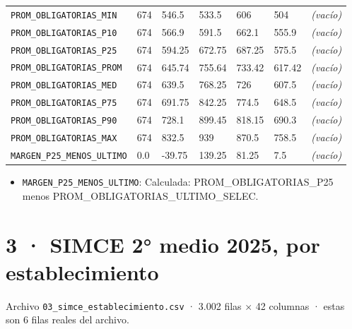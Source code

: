 \documentclass[10pt]{article}
\begin{document}
\begin{xltabular}{\linewidth}{@{}p{4.3cm} Y Y Y Y Y Y @{}}
\texttt{PROM\_\allowbreak{}OBLIGATORIAS\_\allowbreak{}MIN} & 674 & 546.5 & 533.5 & 606 & 504 & \textit{\color{gris}(vacío)} \\
\texttt{PROM\_\allowbreak{}OBLIGATORIAS\_\allowbreak{}P10} & 674 & 566.9 & 591.5 & 662.1 & 555.9 & \textit{\color{gris}(vacío)} \\
\texttt{PROM\_\allowbreak{}OBLIGATORIAS\_\allowbreak{}P25} & 674 & 594.25 & 672.75 & 687.25 & 575.5 & \textit{\color{gris}(vacío)} \\
\texttt{PROM\_\allowbreak{}OBLIGATORIAS\_\allowbreak{}PROM} & 674 & 645.74 & 755.64 & 733.42 & 617.42 & \textit{\color{gris}(vacío)} \\
\texttt{PROM\_\allowbreak{}OBLIGATORIAS\_\allowbreak{}MED} & 674 & 639.5 & 768.25 & 726 & 607.5 & \textit{\color{gris}(vacío)} \\
\texttt{PROM\_\allowbreak{}OBLIGATORIAS\_\allowbreak{}P75} & 674 & 691.75 & 842.25 & 774.5 & 648.5 & \textit{\color{gris}(vacío)} \\
\texttt{PROM\_\allowbreak{}OBLIGATORIAS\_\allowbreak{}P90} & 674 & 728.1 & 899.45 & 818.15 & 690.3 & \textit{\color{gris}(vacío)} \\
\texttt{PROM\_\allowbreak{}OBLIGATORIAS\_\allowbreak{}MAX} & 674 & 832.5 & 939 & 870.5 & 758.5 & \textit{\color{gris}(vacío)} \\
\texttt{MARGEN\_\allowbreak{}P25\_\allowbreak{}MENOS\_\allowbreak{}ULTIMO} & 0.0 & -{}39.75 & 139.25 & 81.25 & 7.5 & \textit{\color{gris}(vacío)} \\
\end{xltabular}
\normalsize

\begin{alertabox}
\begin{itemize}[leftmargin=1.4em,itemsep=2pt,topsep=2pt]
\item \texttt{MARGEN\_\allowbreak{}P25\_\allowbreak{}MENOS\_\allowbreak{}ULTIMO}: Calculada: PROM\_OBLIGATORIAS\_P25 menos PROM\_OBLIGATORIAS\_ULTIMO\_SELEC.
\end{itemize}
\end{alertabox}

\clearpage
\hypertarget{base3}{}
\section{3 · SIMCE 2° medio 2025, por establecimiento}
\small Archivo \texttt{03\_simce\_establecimiento.csv} · 3.002 filas × 42 columnas · estas son 6 filas reales del archivo.\normalsize
\end{document}
